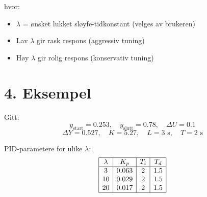 \documentclass[a4paper,12pt]{article}
\begin{document}
\noindent hvor:
\begin{itemize}
    \item $\lambda$ = ønsket lukket sløyfe-tidkonstant (velges av brukeren)
    \item Lav $\lambda$ gir rask respons (aggressiv tuning)
    \item Høy $\lambda$ gir rolig respons (konservativ tuning)
\end{itemize}

\section*{4. Eksempel}
Gitt:
\[
y_{\text{start}} = 0.253, \quad y_{\text{slutt}} = 0.78, \quad \Delta U = 0.1
\]
\[
\Delta Y = 0.527, \quad K = 5.27, \quad L = 3 \text{ s}, \quad T = 2 \text{ s}
\]

\noindent PID-parametere for ulike $\lambda$:
\[
\begin{array}{|c|c|c|c|}
\hline
\lambda & K_p & T_i & T_d \\
\hline
3 & 0.063 & 2 & 1.5 \\
10 & 0.029 & 2 & 1.5 \\
20 & 0.017 & 2 & 1.5 \\
\hline
\end{array}
\]
\end{document}
